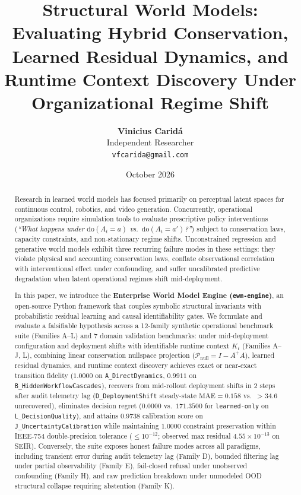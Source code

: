 \documentclass[11pt,a4paper]{article}
\title{\textbf{Structural World Models: Evaluating Hybrid Conservation, Learned Residual Dynamics, and Runtime Context Discovery Under Organizational Regime Shift}}
\author{
  \textbf{Vinicius Caridá} \\
  Independent Researcher \\
  \texttt{vfcarida@gmail.com}
}
\date{October 2026}
\begin{document}
\maketitle

\begin{abstract}
Research in learned world models has focused primarily on perceptual latent spaces for continuous control, robotics, and video generation. Concurrently, operational organizations require simulation tools to evaluate prescriptive policy interventions (\emph{``What happens under $\text{do}(A_t = a)$ vs.\ $\text{do}(A_t = a')$?''}) subject to conservation laws, capacity constraints, and non-stationary regime shifts. Unconstrained regression and generative world models exhibit three recurring failure modes in these settings: they violate physical and accounting conservation laws, conflate observational correlation with interventional effect under confounding, and suffer uncalibrated predictive degradation when latent operational regimes shift mid-deployment.

In this paper, we introduce the \textbf{Enterprise World Model Engine (\texttt{ewm-engine})}, an open-source Python framework that couples symbolic structural invariants with probabilistic residual learning and causal identifiability gates. We formulate and evaluate a falsifiable hypothesis across a 12-family synthetic operational benchmark suite (Families A--L) and 7 domain validation benchmarks: under mid-deployment configuration and deployment shifts with identifiable runtime context $K_t$ (Families A--J, L), combining linear conservation nullspace projection ($\mathcal{P}_{\text{null}} = I - A^+ A$), learned residual dynamics, and runtime context discovery achieves exact or near-exact transition fidelity ($1.0000$ on \texttt{A\_DirectDynamics}, $0.9911$ on \texttt{B\_HiddenWorkflowCascades}), recovers from mid-rollout deployment shifts in $2$ steps after audit telemetry lag (\texttt{D\_DeploymentShift} steady-state $\text{MAE} = 0.158$ vs.\ $>34.6$ unrecovered), eliminates decision regret ($0.0000$ vs.\ $171.3500$ for \texttt{learned-only} on \texttt{L\_DecisionQuality}), and attains $0.9738$ calibration score on \texttt{J\_UncertaintyCalibration} while maintaining $1.0000$ constraint preservation within IEEE-754 double-precision tolerance ($\le 10^{-12}$; observed max residual $4.55 \times 10^{-13}$ on SEIR). Conversely, the suite exposes honest failure modes across all paradigms, including transient error during audit telemetry lag (Family D), bounded filtering lag under partial observability (Family E), fail-closed refusal under unobserved confounding (Family H), and raw prediction breakdown under unmodeled OOD structural collapse requiring abstention (Family K).
\end{abstract}
\end{document}

